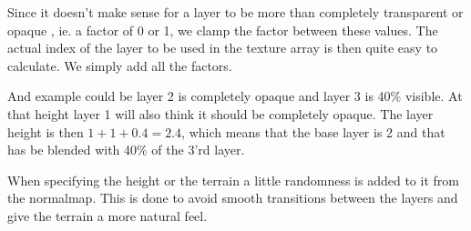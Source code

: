 Since it doesn't make sense for a layer to be more than completely
transparent or opaque , ie. a factor of 0 or 1, we clamp the factor
between these values. The actual index of the layer to be used in the
texture array is then quite easy to calculate. We simply add all the
factors. 

And example could be layer 2 is completely opaque and layer 3 is 40\%
visible. At that height layer 1 will also think it should be
completely opaque. The layer height is then $1 + 1 + 0.4 = 2.4$, which
means that the base layer is 2 and that has be blended with 40\% of
the 3'rd layer.

When specifying the height or the terrain a little randomness is added
to it from the normalmap. This is done to avoid smooth transitions
between the layers and give the terrain a more natural feel.


